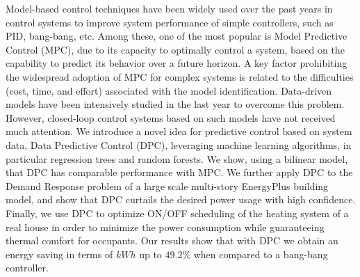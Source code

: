Model-based control techniques have been widely used over the past years in control systems to improve system performance of simple controllers, such as PID, bang-bang, etc. Among these, one of the most popular is Model Predictive Control (MPC), due to its capacity to optimally control a system, based on the capability to predict its behavior over a future horizon. A key factor prohibiting the widespread adoption of MPC for complex systems is related to the difficulties (cost, time, and effort) associated with the model identification. Data-driven models have been intensively studied in the last year to overcome this problem. However, closed-loop control systems based on such models have not received much attention. We introduce a novel idea for predictive control based on system data, Data Predictive Control (DPC), leveraging machine learning algorithms, in particular regression trees and random forests. We show, using a bilinear model, that DPC has comparable performance with MPC. We further apply DPC to the Demand Response problem of a large scale multi-story EnergyPlus building model, and show that DPC curtails the desired power usage with high confidence. Finally, we use DPC to optimize ON/OFF scheduling of the heating system of a real house in order to minimize the power consumption while guaranteeing thermal comfort for occupants. Our results show that with DPC we obtain an energy saving in terms of $kWh$ up to $49.2\%$ when compared to a bang-bang controller.